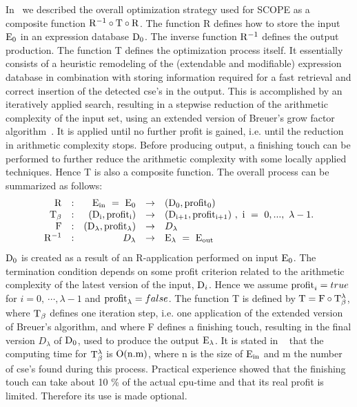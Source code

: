 In~\cite{vanHulzen:81,vanHulzen:83} we described the overall
optimization strategy used for
SCOPE as a composite function ${{\rm R}^{-1}} \circ {{\rm T}}
\circ {{\rm R}}$.  The function R defines how to store the input
${{\rm E}}_{0}$ in an expression database ${{\rm D}}_{0}$.
The inverse function ${{\rm R}}^{{-1}}$ defines the output production.
The function T defines the
optimization process itself. It essentially consists of a heuristic
remodeling of the (extendable and modifiable) expression database
in combination with storing information required for a fast
retrieval and correct insertion of the detected cse's in the output.
This is accomplished by an iteratively
applied search, resulting in a stepwise reduction of the arithmetic
complexity of the input set, using an extended version of Breuer's
grow factor algorithm~\cite{Breuer:69,vanHulzen:81,vanHulzen:83}.
It is applied until no further profit
is gained, i.e. until the reduction in arithmetic complexity stops.
Before producing output, a finishing touch can be performed to further
reduce the arithmetic complexity with some locally applied techniques.
Hence T is also a composite function.
The overall process can be summarized as follows:
\[ \begin{array}{rcrcl}
{\rm R} & : & {\rm E_{in}}~=~{\rm E_0} & \rightarrow & ({\rm D_0},{\rm profit_0}) \\
{\rm T_{\beta}} & : & ({\rm D_i},{\rm profit_i}) & \rightarrow & ({\rm D_{i+1}},
{\rm profit_{i+1}})~,~{\rm i}~=~0,...,~\lambda - 1.  \\
{\rm F} & : & ({\rm D_{\lambda}},{\rm profit_{\lambda}}) & \rightarrow & {D_{\lambda}}\\
{\rm R^{-1}} & : & {D_{\lambda}} & \rightarrow & {\rm E_{\lambda}}~=~{\rm E_{out}}
\end{array} \]
 ${\rm D_0}$ is created as a result of an R-application performed on
input ${\rm E_0}$. The termination condition depends on some profit criterion
related to the arithmetic complexity of the latest version of the
input, ${{{\rm D}}_i}$. Hence we assume ${{{\rm profit}}_i} = true$
for $i =0,~\cdots , \lambda -1$ and ${{{\rm profit}}_\lambda} =
false$.  The function T is defined
by ${\rm T} = {\rm F} \circ {\rm T_{\beta}^{\lambda}}$, where
${{\rm T}}_{\beta}$ defines one iteration step, i.e. one application of the
extended version of Breuer's algorithm, and where F defines a
finishing touch, resulting in the final version $D_{\lambda}$ of
${{\rm D}}_{0}$, used to produce the output ${{\rm E}}_{\lambda}$.
It is stated in ~\cite{vanHulzen:83} that the computing time for
${\rm T_{\beta}^{\lambda}}$ is ${\rm O(n.m)}$, where n is the size
of ${\rm E_{in}}$ and m the number of cse's found during this process.
Practical experience showed that the finishing touch can take about
10 \% of the actual cpu-time and that its real profit is limited.
Therefore its use is made optional.

